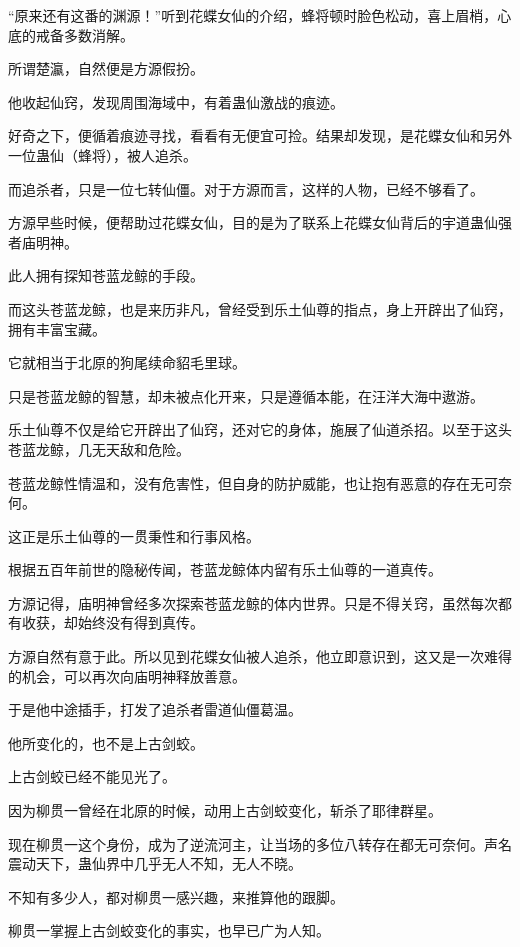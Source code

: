 
\begin{this_body}

“原来还有这番的渊源！”听到花蝶女仙的介绍，蜂将顿时脸色松动，喜上眉梢，心底的戒备多数消解。

所谓楚瀛，自然便是方源假扮。

他收起仙窍，发现周围海域中，有着蛊仙激战的痕迹。

好奇之下，便循着痕迹寻找，看看有无便宜可捡。结果却发现，是花蝶女仙和另外一位蛊仙（蜂将），被人追杀。

而追杀者，只是一位七转仙僵。对于方源而言，这样的人物，已经不够看了。

方源早些时候，便帮助过花蝶女仙，目的是为了联系上花蝶女仙背后的宇道蛊仙强者庙明神。

此人拥有探知苍蓝龙鲸的手段。

而这头苍蓝龙鲸，也是来历非凡，曾经受到乐土仙尊的指点，身上开辟出了仙窍，拥有丰富宝藏。

它就相当于北原的狗尾续命貂毛里球。

只是苍蓝龙鲸的智慧，却未被点化开来，只是遵循本能，在汪洋大海中遨游。

乐土仙尊不仅是给它开辟出了仙窍，还对它的身体，施展了仙道杀招。以至于这头苍蓝龙鲸，几无天敌和危险。

苍蓝龙鲸性情温和，没有危害性，但自身的防护威能，也让抱有恶意的存在无可奈何。

这正是乐土仙尊的一贯秉性和行事风格。

根据五百年前世的隐秘传闻，苍蓝龙鲸体内留有乐土仙尊的一道真传。

方源记得，庙明神曾经多次探索苍蓝龙鲸的体内世界。只是不得关窍，虽然每次都有收获，却始终没有得到真传。

方源自然有意于此。所以见到花蝶女仙被人追杀，他立即意识到，这又是一次难得的机会，可以再次向庙明神释放善意。

于是他中途插手，打发了追杀者雷道仙僵葛温。

他所变化的，也不是上古剑蛟。

上古剑蛟已经不能见光了。

因为柳贯一曾经在北原的时候，动用上古剑蛟变化，斩杀了耶律群星。

现在柳贯一这个身份，成为了逆流河主，让当场的多位八转存在都无可奈何。声名震动天下，蛊仙界中几乎无人不知，无人不晓。

不知有多少人，都对柳贯一感兴趣，来推算他的跟脚。

柳贯一掌握上古剑蛟变化的事实，也早已广为人知。


\end{this_body}
